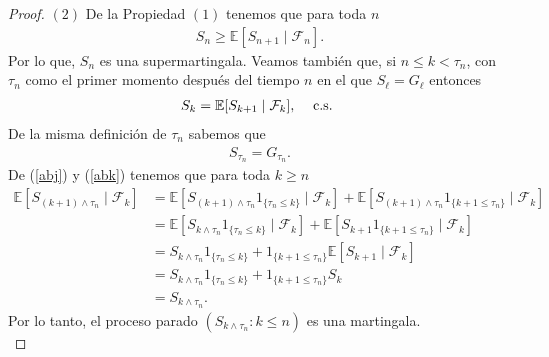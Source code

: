 \begin{proof}
\noindent $(2)$ De la Propiedad $(1)$ tenemos que para toda $n$
	\begin{align*}
	S_n \geq \mathbb{E}[S_{n+1} \mid \mathcal{F}_n].
	\end{align*}
Por lo que, $S_n$ es una supermartingala. Veamos también que, si $n \leq k < \tau_n$, con $\tau_n$ como el primer momento después del tiempo $n$ en el que $S_\ell = G_\ell$ entonces
	\begin{align}
	S_k = \mathbb{E}[S_{k+1} \mid \mathcal{F}_k], \hspace{0.3cm} \text{ c.s. } \label{abj}
	\end{align}
De la misma definición de $\tau_n$ sabemos que 
	\begin{align}
	S_{\tau_n} = G_{\tau_n}. \label{abk}
	\end{align}
De (\ref{abj}) y (\ref{abk}) tenemos que para toda $k \geq n$
	\begin{align*}
	\mathbb{E}[S_{(k+1) \wedge \tau_n} \mid \mathcal{F}_k] & = \mathbb{E}[S_{(k+1) \wedge \tau_n} 1_{\{\tau_n \leq k\}} \mid \mathcal{F}_k] + \mathbb{E}[S_{(k+1) \wedge \tau_n} 1_{\{k+1 \leq \tau_n\}} \mid \mathcal{F}_k] \\
	& = \mathbb{E}[S_{k \wedge \tau_n} 1_{\{\tau_n \leq k\}} \mid \mathcal{F}_k] + \mathbb{E}[S_{k+1} 1_{\{k+1 \leq \tau_n\}} \mid \mathcal{F}_k] \\
	& = S_{k \wedge \tau_n} 1_{\{\tau_n \leq k\}} + 1_{\{k+1 \leq \tau_n\}} \mathbb{E}[S_{k+1} \mid \mathcal{F}_k] \\
	& = S_{k \wedge \tau_n} 1_{\{\tau_n \leq k\}} + 1_{\{k+1 \leq \tau_n\}} S_k \\
	& = S_{k \wedge \tau_n}.
	\end{align*}
Por lo tanto, el proceso parado $(S_{k \wedge \tau_n} : k \leq n)$ es una martingala. \\


\end{proof}
